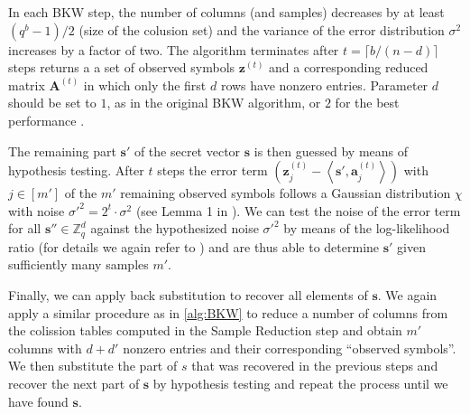 In each BKW step, the number of columns (and samples) decreases by at least $(q^b - 1)/2$ (size of the colusion set) and the variance of the error distribution $\sigma^2$ increases by a factor of two. The algorithm terminates after $t = \lceil b / (n - d)\rceil$ steps returns a a set of observed symbols $\mathbf{z}^{(t)}$ and a corresponding reduced matrix $\mathbf{A}^{(t)}$ in which only the first $d$ rows have nonzero entries. Parameter $d$ should be set to $1$, as in the original BKW algorithm, or $2$ for the best performance \cite{ACFFP15a}.

The remaining part $\mathbf{s}'$ of the secret vector $\mathbf{s}$ is then guessed by means of hypothesis testing. After $t$ steps the error term $\left(\mathbf{z}_j^{(t)} - \left\langle \mathbf{s}', \mathbf{a}_j^{(t)}\right\rangle\right)$ with $j \in [m']$ of the $m'$ remaining observed symbols follows a Gaussian distribution $\chi$ with noise $\sigma'^2 = 2^t\cdot \sigma^2$ (see Lemma 1 in \cite{ACFFP15a}). %
We can test the noise of the error term for all $\mathbf{s}'' \in \mathbb{Z}_q^d$ against the hypothesized noise  $\sigma'^2$ by means of the log-likelihood ratio (for details we again refer to \cite{ACFFP15a}) and are thus able to determine $\mathbf{s}'$ given sufficiently many samples $m'$.

Finally, we can apply back substitution to recover all elements of $\mathbf{s}$. We again apply a similar procedure as in \cref{alg:BKW} to reduce a number of columns from the colission tables computed in the Sample Reduction step and obtain $m'$ columns with $d+d'$ nonzero entries and their corresponding ``observed symbols''. We then substitute the part of $s$ that was recovered in the previous steps and recover the next part of $\mathbf{s}$ by hypothesis testing and repeat the process until we have found $\mathbf{s}$.

